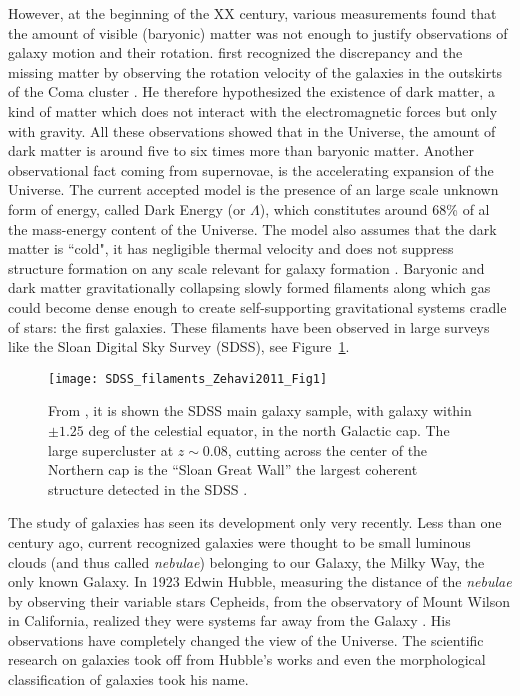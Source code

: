 However, at the beginning of the XX century, various measurements found that the amount of visible (baryonic) matter was not enough to justify observations of galaxy motion and their rotation.
\citet{Zwicky1933} first recognized the discrepancy and the missing matter by observing the rotation velocity of the galaxies in the outskirts of the Coma cluster \citep{Zwicky1937}.
He therefore hypothesized the existence of dark matter, a kind of matter which does not interact with the electromagnetic forces but only with gravity.
All these observations showed that in the Universe, the amount of dark matter is around five to six times more than baryonic matter.
Another observational fact coming from supernovae, is the accelerating expansion of the Universe.
The current accepted model is the presence of an large scale unknown form of energy, called Dark Energy (or $\Lambda$), which constitutes around 68\% of al the mass-energy content of the Universe.
The \lcdm{} model also assumes that the dark matter is ``cold", \ie{} it has negligible thermal velocity and does not suppress structure formation on any scale relevant for galaxy formation \citep{Bullock2017}.
Baryonic and dark matter gravitationally collapsing slowly formed filaments along which gas could become dense enough to create self-supporting gravitational systems cradle of stars: the first galaxies.
These filaments have been observed in large surveys like the Sloan Digital Sky Survey (SDSS), see Figure~\ref{fig:sdss}.
\begin{figure}[hb]
  \centering
  \texttt{[image: SDSS\_filaments\_Zehavi2011\_Fig1]}
  \caption{From \citet{Zehavi2011}, it is shown the SDSS main galaxy sample, with galaxy within $\pm1.25$ deg of the celestial equator, in the north Galactic cap. The large supercluster at $z \sim 0.08$, cutting across the center of the Northern cap is the “Sloan Great Wall” the largest coherent structure detected in the SDSS \citep{GottIII2005}.}
  \label{fig:sdss}
\end{figure}



The study of galaxies has seen its development only very recently.
Less than one century ago, current recognized galaxies were thought to be small luminous clouds (and thus called \emph{nebulae}) belonging to our Galaxy, the Milky Way, the only known Galaxy.
In 1923 Edwin Hubble, measuring the distance of the \emph{nebulae} by observing their variable stars Cepheids, from the observatory of Mount Wilson in California, realized they were systems far away from the Galaxy \citep{Hubble1929}.
His observations have completely changed the view of the Universe.
The scientific research on galaxies took off from Hubble's works and even the morphological classification of galaxies took his name.

